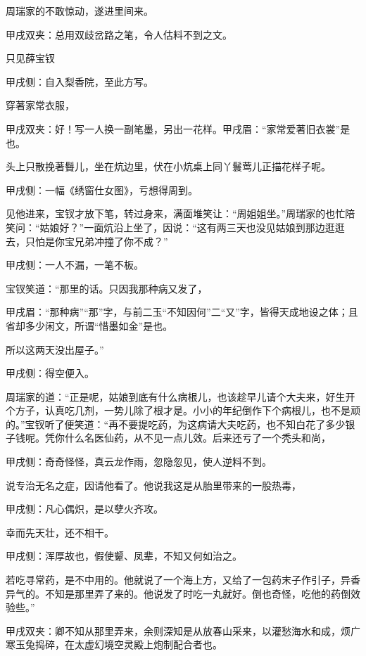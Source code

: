 \begin{parag}
    周瑞家的不敢惊动，遂进里间来。\begin{note}甲戌双夹：总用双歧岔路之笔，令人估料不到之文。\end{note}只见薛宝钗\begin{note}甲戌侧：自入梨香院，至此方写。\end{note}穿著家常衣服，\begin{note}甲戌双夹：好！写一人换一副笔墨，另出一花样。甲戌眉：“家常爱著旧衣裳”是也。\end{note}头上只散挽著䰖儿，坐在炕边里，伏在小炕桌上同丫鬟莺儿正描花样子呢。\begin{note}甲戌侧：一幅《绣窗仕女图》，亏想得周到。\end{note}见他进来，宝钗才放下笔，转过身来，满面堆笑让：“周姐姐坐。”周瑞家的也忙陪笑问：“姑娘好？”一面炕沿上坐了，因说：“这有两三天也没见姑娘到那边逛逛去，只怕是你宝兄弟冲撞了你不成？”\begin{note}甲戌侧：一人不漏，一笔不板。\end{note}宝钗笑道：“那里的话。只因我那种病又发了，\begin{note}甲戌眉：“那种病”“那”字，与前二玉“不知因何”二“又”字，皆得天成地设之体；且省却多少闲文，所谓“惜墨如金”是也。\end{note}所以这两天没出屋子。”\begin{note}甲戌侧：得空便入。\end{note}周瑞家的道：“正是呢，姑娘到底有什么病根儿，也该趁早儿请个大夫来，好生开个方子，认真吃几剂，一势儿除了根才是。小小的年纪倒作下个病根儿，也不是顽的。”宝钗听了便笑道：“再不要提吃药，为这病请大夫吃药，也不知白花了多少银子钱呢。凭你什么名医仙药，从不见一点儿效。后来还亏了一个秃头和尚，\begin{note}甲戌侧：奇奇怪怪，真云龙作雨，忽隐忽见，使人逆料不到。\end{note}说专治无名之症，因请他看了。他说我这是从胎里带来的一股热毒，\begin{note}甲戌侧：凡心偶炽，是以孽火齐攻。\end{note}幸而先天壮，还不相干。\begin{note}甲戌侧：浑厚故也，假使颦、凤辈，不知又何如治之。\end{note}若吃寻常药，是不中用的。他就说了一个海上方，又给了一包药末子作引子，异香异气的。不知是那里弄了来的。他说发了时吃一丸就好。倒也奇怪，吃他的药倒效验些。”\begin{note}甲戌双夹：卿不知从那里弄来，余则深知是从放春山采来，以灌愁海水和成，烦广寒玉兔捣碎，在太虚幻境空灵殿上炮制配合者也。\end{note}
\end{parag}



